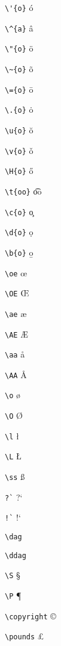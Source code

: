 \documentclass{article}
\begin{document}
\verb|\'{o}| \'{o}

\verb|\^{a}| \^{a}

\verb|\"{o}| \"{o}

\verb|\~{o}| \~{o}

\verb|\={o}| \={o}

\verb|\.{o}| \.{o}

\verb|\u{o}| \u{o}

\verb|\v{o}| \v{o}

\verb|\H{o}| \H{o}

\verb|\t{oo}| \t{oo}

\verb|\c{o}| \c{o}

\verb|\d{o}| \d{o}

\verb|\b{o}| \b{o}

\verb|\oe| \oe

\verb|\OE| \OE

\verb|\ae| \ae

\verb|\AE| \AE

\verb|\aa| \aa

\verb|\AA| \AA

\verb|\o| \o

\verb|\O| \O

\verb|\l| \l

\verb|\L| \L

\verb|\ss| \ss

\verb|?`| ?`

\verb|!`| !`

\verb|\dag| \dag

\verb|\ddag| \ddag

\verb|\S| \S

\verb|\P| \P

\verb|\copyright| \copyright

\verb|\pounds| \pounds
\end{document}

